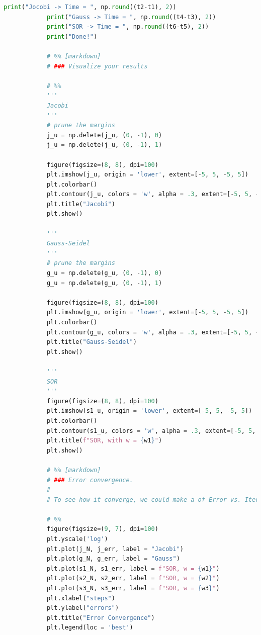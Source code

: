 \documentclass[12pt]{article}
\begin{document}
\begin{lstlisting}[language={Python}]
            print("Jocobi -> Time = ", np.round((t2-t1), 2))
            print("Gauss -> Time = ", np.round((t4-t3), 2))
            print("SOR -> Time = ", np.round((t6-t5), 2))
            print("Done!")
            
            # %% [markdown]
            # ### Visualize your results
            
            # %%
            '''
            Jacobi
            '''
            # prune the margins
            j_u = np.delete(j_u, (0, -1), 0)
            j_u = np.delete(j_u, (0, -1), 1)
            
            figure(figsize=(8, 8), dpi=100)
            plt.imshow(j_u, origin = 'lower', extent=[-5, 5, -5, 5])
            plt.colorbar()
            plt.contour(j_u, colors = 'w', alpha = .3, extent=[-5, 5, -5, 5])
            plt.title("Jacobi")
            plt.show()
            
            '''
            Gauss-Seidel
            '''
            # prune the margins
            g_u = np.delete(g_u, (0, -1), 0)
            g_u = np.delete(g_u, (0, -1), 1)
            
            figure(figsize=(8, 8), dpi=100)
            plt.imshow(g_u, origin = 'lower', extent=[-5, 5, -5, 5])
            plt.colorbar()
            plt.contour(g_u, colors = 'w', alpha = .3, extent=[-5, 5, -5, 5])
            plt.title("Gauss-Seidel")
            plt.show()
            
            '''
            SOR
            '''
            figure(figsize=(8, 8), dpi=100)
            plt.imshow(s1_u, origin = 'lower', extent=[-5, 5, -5, 5])
            plt.colorbar()
            plt.contour(s1_u, colors = 'w', alpha = .3, extent=[-5, 5, -5, 5])
            plt.title(f"SOR, with w = {w1}")
            plt.show()
            
            # %% [markdown]
            # ### Error convergence.
            # 
            # To see how it converge, we could make a of Error vs. Iteration times to see how it converges.
            
            # %%
            figure(figsize=(9, 7), dpi=100)
            plt.yscale('log')
            plt.plot(j_N, j_err, label = "Jacobi")
            plt.plot(g_N, g_err, label = "Gauss")
            plt.plot(s1_N, s1_err, label = f"SOR, w = {w1}")
            plt.plot(s2_N, s2_err, label = f"SOR, w = {w2}")
            plt.plot(s3_N, s3_err, label = f"SOR, w = {w3}")
            plt.xlabel("steps")
            plt.ylabel("errors")
            plt.title("Error Convergence")
            plt.legend(loc = 'best')            
        \end{lstlisting}
\end{document}
